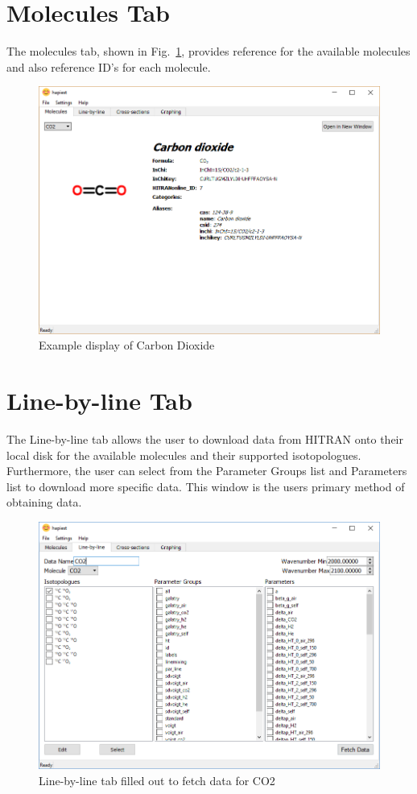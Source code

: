 \documentclass[12pt]{article}
\begin{document}
\newpage

\section{Molecules Tab}
The molecules tab, shown in Fig.~\ref{fig:molecules}, provides reference for the available molecules and also reference ID's for each molecule.
\begin{figure}[h]
\centering
\includegraphics[scale = 0.6]{hapiest_molecules}
\caption{Example display of Carbon Dioxide}
\label{fig:molecules}
\end{figure}


\section{Line-by-line Tab}
The Line-by-line tab allows the user to download data from HITRAN onto their local disk for the available molecules and their supported isotopologues. Furthermore, the user can select from the Parameter Groups list and Parameters list to download more specific data. This window is the users primary method of obtaining data.
\begin{figure}[h]
\centering
\includegraphics[scale = 0.6]{hapiest_line_by_line}
\caption{Line-by-line tab filled out to fetch data for CO2}
\label{fig:line-by-line}
\end{figure}
\end{document}
